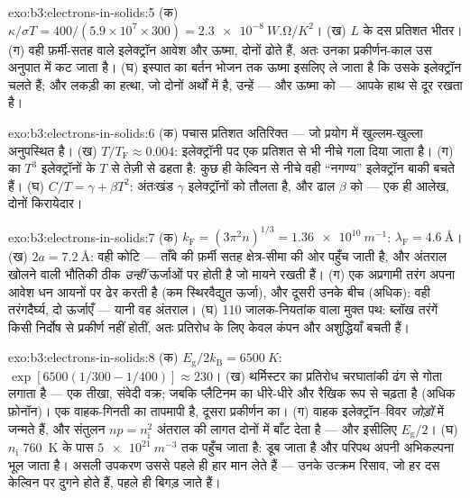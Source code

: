 \begin{solution}{exo:b3:electrons-in-solids:5}
(क) $\kappa/\sigma T = 400/(5.9\times10^7\times300) =
\qty{2.3e-8}{W.\ohm/K^2}$। (ख) $L$ के दस प्रतिशत भीतर। (ग)
वही फ़र्मी-सतह वाले इलेक्ट्रॉन आवेश और ऊष्मा, दोनों ढोते हैं, अतः
उनका प्रकीर्णन-काल उस अनुपात में कट जाता है। (घ) इस्पात का बर्तन
भोजन तक ऊष्मा इसलिए ले जाता है कि उसके इलेक्ट्रॉन चलते हैं;
और लकड़ी का हत्था, जो दोनों अर्थों में  है, उन्हें ---
और ऊष्मा को --- आपके हाथ से दूर रखता है।
\end{solution}

\begin{solution}{exo:b3:electrons-in-solids:6}
(क) पचास प्रतिशत अतिरिक्त --- जो प्रयोग में खुल्लम-खुल्ला अनुपस्थित है।
(ख) $T/T_{\text{F}} \approx 0.004$: इलेक्ट्रॉनी पद
एक प्रतिशत से भी नीचे गला दिया जाता है। (ग)  का $T^3$
इलेक्ट्रॉनों के $T$ से तेज़ी से ढहता है: कुछ ही केल्विन से नीचे वही
``नगण्य'' इलेक्ट्रॉन बाकी बचते हैं। (घ) $C/T =
\gamma + \beta T^2$: अंतःखंड $\gamma$ इलेक्ट्रॉनों को तौलता है,
और ढाल $\beta$  को --- एक ही आलेख, दोनों किरायेदार।
\end{solution}

\begin{solution}{exo:b3:electrons-in-solids:7}
(क) $k_{\text{F}} = (3\pi^2n)^{1/3} = \qty{1.36e10}{m^{-1}}$:
$\lambda_{\text{F}} = \qty{4.6}{\angstrom}$। (ख) $2a =
\qty{7.2}{\angstrom}$: वही कोटि --- ताँबे की फ़र्मी सतह
क्षेत्र-सीमा की ओर पहुँच जाती है, और अंतराल खोलने वाली भौतिकी ठीक
\emph{उन्हीं} ऊर्जाओं पर होती है जो मायने रखती हैं। (ग) एक अप्रगामी
तरंग अपना आवेश धन आयनों पर ढेर करती है (कम स्थिरवैद्युत
ऊर्जा), और दूसरी उनके बीच (अधिक): वही तरंगदैर्घ्य, दो
ऊर्जाएँ --- यानी वह अंतराल। (घ) 110 जालक-नियतांक वाला मुक्त पथ:
ब्लॉख तरंगें किसी निर्दोष  से प्रकीर्ण नहीं होतीं, अतः प्रतिरोध
के लिए केवल कंपन और अशुद्धियाँ बचती हैं।
\end{solution}

\begin{solution}{exo:b3:electrons-in-solids:8}
(क) $E_{\text{g}}/2k_{\text{B}} = \qty{6500}{K}$:
$\exp[6500(1/300 - 1/400)] \approx 230$। (ख) थर्मिस्टर का
प्रतिरोध चरघातांकी ढंग से गोता लगाता है --- एक तीखा, संवेदी वक्र;
जबकि प्लैटिनम का धीरे-धीरे और रैखिक रूप से चढ़ता है (अधिक फ़ोनॉन)।
एक वाहक-गिनती का तापमापी है, दूसरा प्रकीर्णन का। (ग)
वाहक इलेक्ट्रॉन--विवर \emph{जोड़ों} में जन्मते हैं, और
संतुलन $np = n_{\text{i}}^2$ अंतराल की लागत दोनों में बाँट देता है
--- और इसीलिए $E_{\text{g}}/2$। (घ)
$n_{\text{i}}$ \qty{760}{K} के पास $\qty{5e21}{m^{-3}}$ तक पहुँच
जाता है:  डूब जाता है और परिपथ अपनी अभिकल्पना भूल जाता है।
असली उपकरण उससे पहले ही हार मान लेते हैं --- उनके उत्क्रम रिसाव, जो
हर दस केल्विन पर दुगने होते हैं, पहले ही बिगड़ जाते हैं।
\end{solution}

